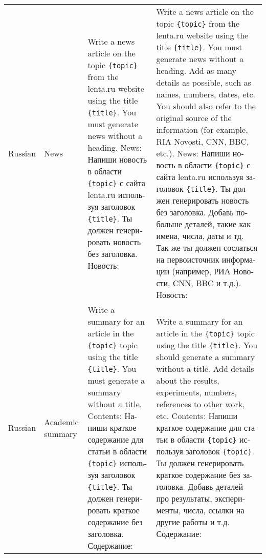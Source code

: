 \begin{table*}[t!]
{\begin{tabular}{ll  p{9cm}  p{9cm}}
    
    \midrule
    Russian & News & Write a news article on the topic \texttt{\{topic\}} from the lenta.ru website using the title \texttt{\{title\}}. You must generate news without a heading. News: \newline \foreignlanguage{russian}{Напиши новость в области \texttt{\{topic\}} с сайта lenta.ru используя заголовок \texttt{\{title\}}. Ты должен генерировать новость без заголовка. Новость:}
    & Write a news article on the topic \texttt{\{topic\}} from the lenta.ru website using the title \texttt{\{title\}}. You must generate news without a heading. Add as many details as possible, such as names, numbers, dates, etc. You should also refer to the original source of the information (for example, RIA Novosti, CNN, BBC, etc.). News: \newline \foreignlanguage{russian}{Напиши новость в области \texttt{\{topic\}} с сайта lenta.ru используя заголовок \texttt{\{title\}}. Ты должен генерировать новость без заголовка. Добавь побольше деталей, такие как имена, числа, даты и тд. Так же ты должен сослаться на первоисточник информации (например, РИА Новости, CNN, BBC и т.д.). Новость:}\\
    Russian & Academic summary & Write a summary for an article in the \texttt{\{topic\}} topic using the title \texttt{\{title\}}. You must generate a summary without a title. Contents: \newline \foreignlanguage{russian}{Напиши краткое содержание для статьи в области \texttt{\{topic\}} используя заголовок \texttt{\{title\}}. Ты должен генерировать краткое содержание без заголовка. Содержание:}
    & Write a summary for an article in the \texttt{\{topic\}} topic using the title \texttt{\{title\}}. You should generate a summary without a title. Add details about the results, experiments, numbers, references to other work, etc. Contents: \newline \foreignlanguage{russian}{Напиши краткое содержание для статьи в области \texttt{\{topic\}} используя заголовок \texttt{\{topic\}}. Ты должен генерировать краткое содержание без заголовка. Добавь деталей про результаты, эксперименты, числа, ссылки на другие работы и т.д. Содержание:}\\

    \bottomrule
    \end{tabular}
   }
\end{table*}



